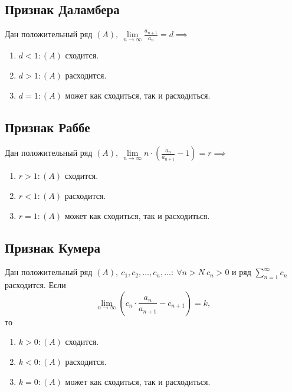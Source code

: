 \subsection{Признак Даламбера}

\begin{theorem}
    Дан положительный ряд $(A), \ \underset{n\rightarrow\infty}{\lim}\frac{a_{n+1}}{a_n} = d \implies $
    \begin{enumerate}
        \item $d < 1:(A)$ сходится.
        \item $d > 1:(A)$ расходится.
        \item $d = 1:(A)$ может как сходиться, так и расходиться.
    \end{enumerate}
\end{theorem}

\subsection{Признак Раббе}

\begin{theorem}
    Дан положительный ряд $(A), \ \underset{n\rightarrow\infty}{\lim}n \cdot \left(\frac{a_n}{a_{n+1}} - 1\right) = r \implies $
    \begin{enumerate}
        \item $r>1: (A)$ сходится.
        \item $r<1: (A)$ расходится.
        \item $r=1: (A)$ может как сходиться, так и расходиться.
    \end{enumerate}
\end{theorem}

\newpage

\subsection{Признак Кумера}

\begin{theorem}
    Дан положительный ряд $(A), \ c_1,c_2,\ldots,c_n,\ldots: \ \forall n > N \ c_n > 0$ и ряд $\sum_{n=1}^{\infty}c_n$ расходится. Если
    \[
        \underset{n\rightarrow\infty}{\lim}\left(c_n \cdot \frac{a_n}{a_{n+1}} - c_{n+1}\right) = k,
    \]
    то
    \begin{enumerate}
        \item $k > 0: (A)$ сходится.
        \item $k < 0: (A)$ расходится.
        \item $k = 0: (A)$ может как сходиться, так и расходиться.
    \end{enumerate}
\end{theorem}


